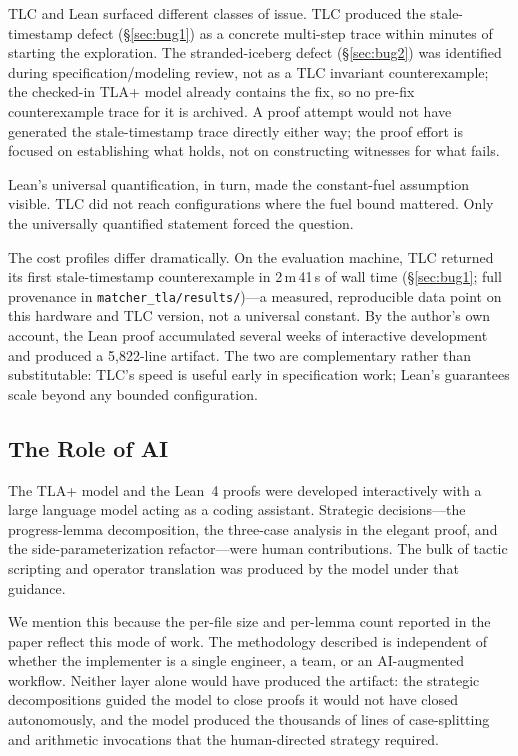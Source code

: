 \documentclass[11pt,a4paper]{article}
\begin{document}
TLC and Lean surfaced different classes of issue. TLC produced the
stale-timestamp defect (\S\ref{sec:bug1}) as a concrete multi-step trace
within minutes of starting the exploration. The stranded-iceberg defect
(\S\ref{sec:bug2}) was identified during specification/modeling review,
not as a TLC invariant counterexample; the checked-in TLA+ model already
contains the fix, so no pre-fix counterexample trace for it is archived.
A proof attempt would not have generated the stale-timestamp trace
directly either way; the proof effort is focused on establishing what
holds, not on constructing witnesses for what fails.

Lean's universal quantification, in turn, made the constant-fuel
assumption visible. TLC did not reach configurations where the fuel
bound mattered. Only the universally quantified statement forced the
question.

The cost profiles differ dramatically. On the evaluation machine, TLC
returned its first stale-timestamp counterexample in 2\,m\,41\,s of wall
time (\S\ref{sec:bug1}; full provenance in
\texttt{matcher\_tla/results/})---a measured, reproducible data point on
this hardware and TLC version, not a universal constant. By the author's
own account, the Lean proof accumulated several weeks of interactive
development and produced a 5{,}822-line artifact. The two are
complementary rather than substitutable: TLC's speed is useful early in
specification work; Lean's guarantees scale beyond any bounded
configuration.

\subsection{The Role of AI}
\label{sec:lessons-ai}

The TLA+ model and the Lean~4 proofs were developed interactively with
a large language model acting as a coding assistant. Strategic decisions---the progress-lemma decomposition, the
three-case analysis in the elegant proof, and the side-parameterization
refactor---were human contributions. The bulk of tactic scripting and
operator translation was produced by the model under that guidance.

We mention this because the per-file size and per-lemma count reported
in the paper reflect this mode of work. The methodology described is
independent of whether the implementer is a single engineer, a team, or
an AI-augmented workflow. Neither layer alone would have produced the
artifact: the strategic decompositions guided the model to close proofs
it would not have closed autonomously, and the model produced the
thousands of lines of case-splitting and arithmetic invocations that
the human-directed strategy required.
\end{document}
